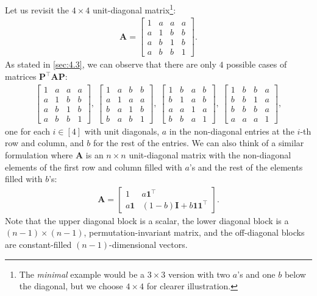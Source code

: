 \documentclass{article}
\theoremstyle{plain}
\theoremstyle{definition}
\theoremstyle{remark}
\def\vone{{\bm{1}}}
\def\mA{{\bm{A}}}
\def\mI{{\bm{I}}}
\def\mP{{\bm{P}}}
\begin{document}
Let us revisit the $4 \times 4$ unit-diagonal matrix\footnote{The \emph{minimal} example would be a $3 \times 3$ version with two $a$'s and one $b$ below the diagonal, but we choose $4 \times 4$ for clearer illustration.}:
\begin{align}
    \mA = \begin{bmatrix}
        1 & a & a & a \\
        a & 1 & b & b \\
        a & b & 1 & b \\
        a & b & b & 1
    \end{bmatrix}.
\end{align}
As stated in \cref{sec:4.3}, we can observe that there are only $4$ possible cases of matrices $\mP^{\top} \mA \mP$:
\begin{align*}
    \begin{bmatrix}
        1 & a & a & a \\
        a & 1 & b & b \\
        a & b & 1 & b \\
        a & b & b & 1
    \end{bmatrix}, \ 
    \begin{bmatrix}
        1 & a & b & b \\
        a & 1 & a & a \\
        b & a & 1 & b \\
        b & a & b & 1
    \end{bmatrix}, \ 
    \begin{bmatrix}
        1 & b & a & b \\
        b & 1 & a & b \\
        a & a & 1 & a \\
        b & b & a & 1
    \end{bmatrix}, \ 
    \begin{bmatrix}
        1 & b & b & a\\
        b & b & 1 & a \\
        b & b & b & a \\
        a & a & a & 1
    \end{bmatrix},
\end{align*}
one for each $i \in [4]$ with unit diagonals, $a$ in the non-diagonal entries at the $i$-th row and column, and $b$ for the rest of the entries.
We can also think of a similar formulation where $\mA$ is an $n \times n$ unit-diagonal matrix with the non-diagonal elements of the first row and column filled with $a$'s and the rest of the elements filled with $b$'s:
\begin{align}
    \mA = 
    \begin{bmatrix}
        1 & a \vone^{\top} \\ a \vone & (1-b) \mI + b \vone \vone^{\top}
    \end{bmatrix}.
    \label{eq:api}
\end{align}
Note that the upper diagonal block is a scalar, the lower diagonal block is a $(n-1) \times (n-1)$, permutation-invariant matrix, and the off-diagonal blocks are constant-filled $(n-1)$-dimensional vectors.
\end{document}
